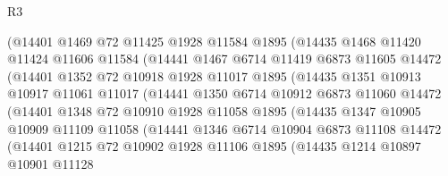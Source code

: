 \begin{lexlean}{R3}
\begin{coremodule}
                  (@14401
                    @1469
                    @72
                    @11425
                    @1928
                    @11584
                    @1895
                    (@14435
                      @1468
                      @11420
                      @11424
                      @11606
                      @11584
                      (@14441
                        @1467
                        @6714
                        @11419
                        @6873
                        @11605
                        @14472
                        (@14401
                          @1352
                          @72
                          @10918
                          @1928
                          @11017
                          @1895
                          (@14435
                            @1351
                            @10913
                            @10917
                            @11061
                            @11017
                            (@14441
                              @1350
                              @6714
                              @10912
                              @6873
                              @11060
                              @14472
                              (@14401
                                @1348
                                @72
                                @10910
                                @1928
                                @11058
                                @1895
                                (@14435
                                  @1347
                                  @10905
                                  @10909
                                  @11109
                                  @11058
                                  (@14441
                                    @1346
                                    @6714
                                    @10904
                                    @6873
                                    @11108
                                    @14472
                                    (@14401
                                      @1215
                                      @72
                                      @10902
                                      @1928
                                      @11106
                                      @1895
                                      (@14435
                                        @1214
                                        @10897
                                        @10901
                                        @11128

\end{coremodule}
\end{lexlean}
